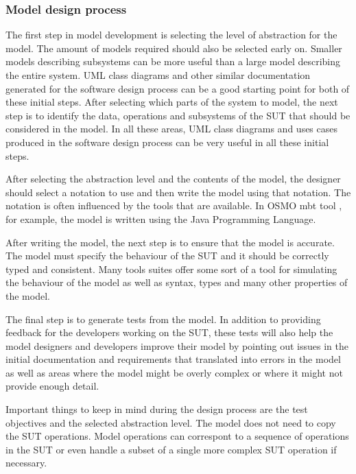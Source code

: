 	
\subsubsection{Model design process}
The first step in model development is selecting the level of abstraction for the model. The amount of models required should also be selected early on. Smaller models describing subsystems can be more useful than a large model describing the entire system. UML class diagrams and other similar documentation generated for the software design process can be a good starting point for both of these initial steps. After selecting which parts of the system to model, the next step is to identify the data, operations and subsystems of the SUT that should be considered in the model. In all these areas, UML class diagrams and uses cases produced in the software design process can be very useful in all these initial steps.

After selecting the abstraction level and the contents of the model, the designer should select a notation to use and then write the model using that notation. The notation is often influenced by the tools that are available. In OSMO mbt tool \cite{OSMO}, for example, the model is written using the Java Programming Language. 

After writing the model, the next step is to ensure that the model is accurate. The model must specify the behaviour of the SUT and it should be correctly typed and consistent. Many tools suites offer some sort of a tool for simulating the behaviour of the model as well as syntax, types and many other properties of the model.

The final step is to generate tests from the model. In addition to providing feedback for the developers working on the SUT, these tests will also help the model designers and developers improve their model by pointing out issues in the initial documentation and requirements that translated into errors in the model as well as areas where the model might be overly complex or where it might not provide enough detail.  

Important things to keep in mind during the design process are the test objectives and the selected abstraction level. The model does not need to copy the SUT operations. Model operations can correspont to a sequence of operations in the SUT or even handle a subset of a single more complex SUT operation if necessary. 

